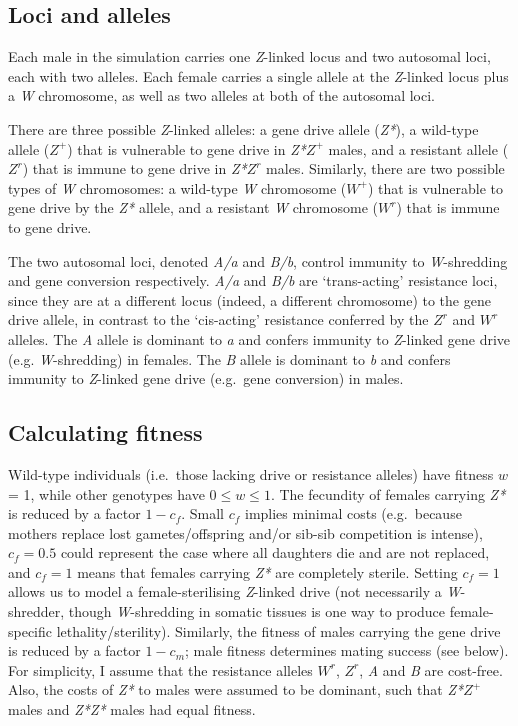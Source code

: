 \documentclass[]{rsos}%
\begin{document}
\hypertarget{loci-and-alleles}{%
\subsection{Loci and alleles}\label{loci-and-alleles}}

Each male in the simulation carries one \emph{Z}-linked locus and two
autosomal loci, each with two alleles. Each female carries a single
allele at the \emph{Z}-linked locus plus a \emph{W} chromosome, as well
as two alleles at both of the autosomal loci.

There are three possible \emph{Z}-linked alleles: a gene drive allele
(\emph{Z*}), a wild-type allele (\(Z^+\)) that is vulnerable to gene
drive in \emph{Z*}\(Z^+\) males, and a resistant allele (\(Z^r\)) that
is immune to gene drive in \emph{Z*}\(Z^r\) males. Similarly, there are
two possible types of \emph{W} chromosomes: a wild-type \emph{W}
chromosome (\(W^+\)) that is vulnerable to gene drive by the \emph{Z*}
allele, and a resistant \emph{W} chromosome (\(W^r\)) that is immune to
gene drive.

The two autosomal loci, denoted \emph{A/a} and \emph{B/b}, control
immunity to \emph{W}-shredding and gene conversion respectively.
\emph{A/a} and \emph{B/b} are `trans-acting' resistance loci, since they
are at a different locus (indeed, a different chromosome) to the gene
drive allele, in contrast to the `cis-acting' resistance conferred by
the \(Z^r\) and \(W^r\) alleles. The \emph{A} allele is dominant to
\emph{a} and confers immunity to \emph{Z}-linked gene drive (e.g.
\emph{W}-shredding) in females. The \emph{B} allele is dominant to
\emph{b} and confers immunity to \emph{Z}-linked gene drive (e.g.~gene
conversion) in males.

\hypertarget{calculating-fitness}{%
\subsection{Calculating fitness}\label{calculating-fitness}}

Wild-type individuals (i.e.~those lacking drive or resistance alleles)
have fitness \(w\) = 1, while other genotypes have \(0 \le w \le 1\).
The fecundity of females carrying \emph{Z*} is reduced by a factor
\(1 - c_f\). Small \(c_f\) implies minimal costs (e.g.~because mothers
replace lost gametes/offspring and/or sib-sib competition is intense),
\(c_f = 0.5\) could represent the case where all daughters die and are
not replaced, and \(c_f = 1\) means that females carrying \emph{Z*} are
completely sterile. Setting \(c_f = 1\) allows us to model a
female-sterilising \emph{Z}-linked drive (not necessarily a
\emph{W}-shredder, though \emph{W}-shredding in somatic tissues is one
way to produce female-specific lethality/sterility). Similarly, the
fitness of males carrying the gene drive is reduced by a factor
\(1 - c_m\); male fitness determines mating success (see below). For
simplicity, I assume that the resistance alleles \(W^r\), \(Z^r\),
\emph{A} and \emph{B} are cost-free. Also, the costs of \emph{Z*} to
males were assumed to be dominant, such that \emph{Z*}\(Z^+\) males and
\emph{Z*Z*} males had equal fitness.
\end{document}
